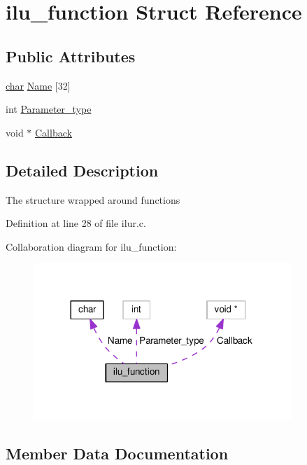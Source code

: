 \hypertarget{structilu__function}{}\section{ilu\+\_\+function Struct Reference}
\label{structilu__function}
\subsection*{Public Attributes}
\begin{DoxyCompactItemize}
\item 
\hyperlink{classchar}{char} \hyperlink{structilu__function_a6664d6d8776c752cd5edadb1bcc95a8a}{Name} \mbox{[}32\mbox{]}
\item 
int \hyperlink{structilu__function_a5f642a9d8c4238dcad1b37abacc6142b}{Parameter\+\_\+type}
\item 
void $\ast$ \hyperlink{structilu__function_accd06e2c636179e49e2ebd0f22cc6754}{Callback}
\end{DoxyCompactItemize}


\subsection{Detailed Description}
The structure wrapped around functions 

Definition at line 28 of file ilur.\+c.



Collaboration diagram for ilu\+\_\+function\+:
\nopagebreak
\begin{figure}[H]
\begin{center}
\leavevmode
\includegraphics[width=276pt]{da/d9a/structilu__function__coll__graph}
\end{center}
\end{figure}


\subsection{Member Data Documentation}
\mbox{\label{structilu__function_accd06e2c636179e49e2ebd0f22cc6754}} 
